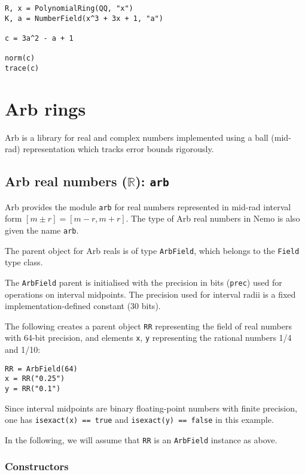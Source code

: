 \documentclass[a4paper,10pt]{article}
\newcommand{\R}{\mathbb{R}}
\newcommand{\code}{\lstinline}
\begin{document}
{{\begin{lstlisting}
R, x = PolynomialRing(QQ, "x")
K, a = NumberField(x^3 + 3x + 1, "a")

c = 3a^2 - a + 1

norm(c)
trace(c)
\end{lstlisting}

\section{Arb rings}

Arb is a library for real and complex numbers implemented using
a ball (mid-rad) representation which tracks error bounds rigorously.

\subsection{Arb real numbers ($\R$): \code|arb|}

Arb provides the module \code{arb} for real numbers represented
in mid-rad interval form $[m \pm r] = [m-r, m+r]$. The type of Arb real
numbers in Nemo is also given the name \code{arb}.

The parent object for Arb reals is of type \code{ArbField}, which
belongs to the \code{Field} type class.

The \code{ArbField} parent is initialised with the precision in bits (\code{prec})
used for operations on interval midpoints. The precision used for
interval radii is a fixed implementation-defined constant (30 bits).

The following creates a parent object \code{RR} representing
the field of real numbers with 64-bit precision, and elements
\code{x}, \code{y} representing the rational numbers 1/4 and 1/10:

\begin{lstlisting}
RR = ArbField(64)
x = RR("0.25")
y = RR("0.1")
\end{lstlisting}

Since interval midpoints are binary floating-point numbers with
finite precision, one has
\code{isexact(x) == true} and \code{isexact(y) == false} in this example.

In the following, we will assume that \code{RR} is an \code{ArbField}
instance as above.

\subsubsection{Constructors}

}}
\end{document}
